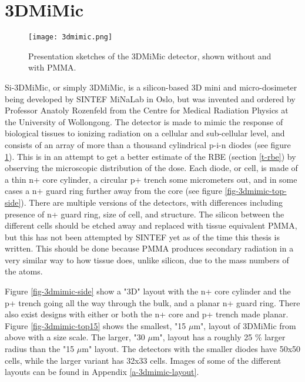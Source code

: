 \documentclass[../main/thesis.tex]{subfiles}
\begin{document}
\section{3DMiMic}
\label{3d-3d}

\begin{figure}%
	\centering
	\texttt{[image: 3dmimic.png]}
	\caption{Presentation sketches of the 3DMiMic detector, shown without and with PMMA. \citep{Trento2015}}
	\label{fig-3dmimic}
\end{figure}

Si-3DMiMic, or simply 3DMiMic, is a silicon-based 3D mini and micro-dosimeter being developed by SINTEF MiNaLab in Oslo, but was invented and ordered by Professor Anatoly Rozenfeld from the Centre for Medical Radiation Physics at the University of Wollongong. The detector is made to mimic the response of biological tissues to ionizing radiation on a cellular and sub-cellular level, and consists of an array of more than a thousand cylindrical p-i-n diodes (see figure \ref{fig-3dmimic}). This is in an attempt to get a better estimate of the \gls{RBE} (section \ref{t-rbe}) by observing the microscopic distribution of the dose. Each diode, or cell, is made of a thin n+ core cylinder, a circular p+ trench some micrometers out, and in some cases a n+ guard ring further away from the core (see figure \ref{fig-3dmimic-top-side}). There are multiple versions of the detectors, with differences including presence of n+ guard ring, size of cell, and structure. The silicon between the different cells should be etched away and replaced with tissue equivalent \gls{PMMA}, but this has not been attempted by SINTEF yet as of the time this thesis is written. This should be done because \gls{PMMA} produces secondary radiation in a very similar way to how tissue does, unlike silicon, due to the mass numbers of the atoms. 


Figure \ref{fig-3dmimic-side} show a "3D" layout with the n+ core cylinder and the p+ trench going all the way through the bulk, and a planar n+ guard ring. There also exist designs with either or both the n+ core and p+ trench made planar. Figure \ref{fig-3dmimic-top15} shows the smallest, "15 $\mu$m", layout of 3DMiMic from above with a size scale. The larger, "30 $\mu$m", layout has a roughly 25 \% larger radius than the "15 $\mu$m" layout. The detectors with the smaller diodes have 50x50 cells, while the larger variant has 32x33 cells. Images of some of the different layouts can be found in Appendix \ref{a-3dmimic-layout}.
\end{document}
